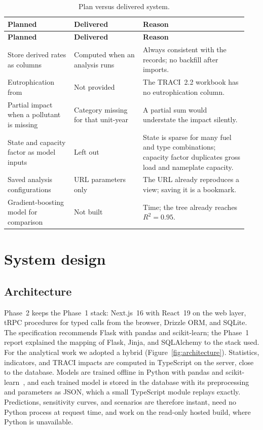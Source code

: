 \documentclass[11pt,a4paper]{article}
\begin{document}
{\small
\begin{longtable}{@{}R{0.26\linewidth}R{0.27\linewidth}R{0.41\linewidth}@{}}
\caption{Plan versus delivered system.}\label{tab:changes}\\
\toprule
\textbf{Planned} & \textbf{Delivered} & \textbf{Reason}\\
\midrule\endfirsthead
\toprule
\textbf{Planned} & \textbf{Delivered} & \textbf{Reason}\\
\midrule\endhead
Store derived rates as columns & Computed when an analysis runs & Always consistent with the records; no backfill after imports.\\
Eutrophication from \NOx{} & Not provided & The TRACI~2.2 workbook has no eutrophication column.\\
Partial impact when a pollutant is missing & Category missing for that unit-year & A partial sum would understate the impact silently.\\
State and capacity factor as model inputs & Left out & State is sparse for many fuel and type combinations; capacity factor duplicates gross load and nameplate capacity.\\
Saved analysis configurations & URL parameters only & The URL already reproduces a view; saving it is a bookmark.\\
Gradient-boosting model for comparison & Not built & Time; the tree already reaches $R^2 = 0.95$.\\
\bottomrule
\end{longtable}}

\section{System design}
\label{sec:design}

\subsection{Architecture}

Phase~2 keeps the Phase~1 stack: Next.js~16 with React~19 on the web layer, tRPC procedures for
typed calls from the browser, Drizzle ORM, and SQLite. The specification recommends Flask with
pandas and scikit-learn; the Phase~1 report explained the mapping of Flask, Jinja, and
SQLAlchemy to the stack used. For the analytical work we adopted a hybrid
(Figure~\ref{fig:architecture}). Statistics, indicators, and TRACI impacts are computed in
TypeScript on the server, close to the database. Models are trained offline in Python with
pandas and scikit-learn~\cite{pedregosa2011sklearn}, and each trained model is stored in the
database with its preprocessing and parameters as JSON, which a small TypeScript module replays
exactly. Predictions, sensitivity curves, and scenarios are therefore instant, need no Python
process at request time, and work on the read-only hosted build, where Python is unavailable.
\end{document}
